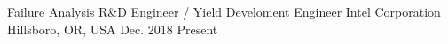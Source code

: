 
\begin{cventries}

  \cventry%
    {Failure Analysis R&D Engineer / Yield Develoment Engineer} %
    {Intel Corporation} %
    {Hillsboro, OR, USA} %
    {Dec. 2018 \textendash{} Present} %
    {
      \begin{cvitems} %
      \end{cvitems}
    }


\end{cventries}

